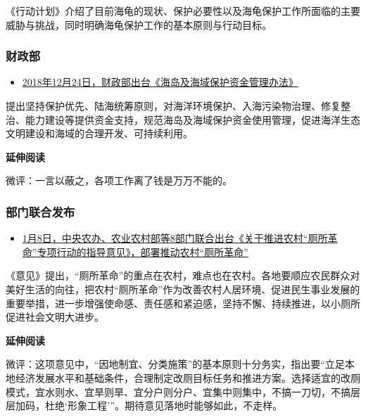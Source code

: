 \documentclass[
]{book}
\providecommand{\tightlist}{%
  \setlength{\itemsep}{0pt}\setlength{\parskip}{0pt}}
\begin{document}
《行动计划》介绍了目前海龟的现状、保护必要性以及海龟保护工作所面临的主要威胁与挑战，同时明确海龟保护工作的基本原则与行动目标。

\hypertarget{ux8d22ux653fux90e8}{%
\subsubsection*{财政部}\label{ux8d22ux653fux90e8}}

\begin{itemize}
\tightlist
\item
  \href{http://jjs.mof.gov.cn/zhengwuxinxi/zhengcefagui/201901/t20190125_3132863.html}{2018年12月24日，财政部出台《海岛及海域保护资金管理办法》}
\end{itemize}

提出坚持保护优先、陆海统筹原则，对海洋环境保护、入海污染物治理、修复整治、能力建设等提供资金支持，规范海岛及海域保护资金使用管理，促进海洋生态文明建设和海域的合理开发、可持续利用。

\textbf{延伸阅读}

微评：一言以蔽之，各项工作离了钱是万万不能的。

\hypertarget{ux90e8ux95e8ux8054ux5408ux53d1ux5e03-2}{%
\subsubsection*{部门联合发布}\label{ux90e8ux95e8ux8054ux5408ux53d1ux5e03-2}}

\begin{itemize}
\tightlist
\item
  \href{http://www.jxwst.gov.cn/doc/2019/01/08/122304.shtml}{1月8日，中央农办、农业农村部等8部门联合出台《关于推进农村``厕所革命''专项行动的指导意见》，部署推动农村``厕所革命''}
\end{itemize}

《意见》提出，``厕所革命''的重点在农村，难点也在农村。各地要顺应农民群众对美好生活的向往，把农村``厕所革命''作为改善农村人居环境、促进民生事业发展的重要举措，进一步增强使命感、责任感和紧迫感，坚持不懈、持续推进，以小厕所促进社会文明大进步。

\textbf{延伸阅读}

微评：这项意见中，``因地制宜、分类施策''的基本原则十分务实，指出要``立足本地经济发展水平和基础条件，合理制定改厕目标任务和推进方案。选择适宜的改厕模式，宜水则水、宜旱则旱、宜分户则分户、宜集中则集中，不搞一刀切，不搞层层加码，杜绝`形象工程'''。期待意见落地时能够如此，不走样。
\end{document}
